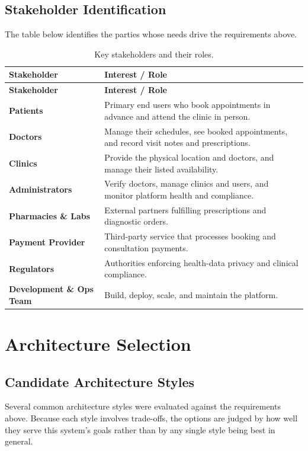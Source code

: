 \documentclass[12pt,a4paper]{article}
\begin{document}
\subsection{Stakeholder Identification}
The table below identifies the parties whose needs drive the requirements above.
\begin{longtable}{>{\bfseries}p{3.2cm} p{10.8cm}}
\caption{Key stakeholders and their roles.}\\
\toprule
\textbf{Stakeholder} & \textbf{Interest / Role}\\
\midrule
\endfirsthead
\toprule
\textbf{Stakeholder} & \textbf{Interest / Role}\\
\midrule
\endhead
Patients & Primary end users who book appointments in advance and attend the clinic in person.\\
Doctors & Manage their schedules, see booked appointments, and record visit notes and
prescriptions.\\
Clinics & Provide the physical location and doctors, and manage their listed availability.\\
Administrators & Verify doctors, manage clinics and users, and monitor platform health and
compliance.\\
Pharmacies \& Labs & External partners fulfilling prescriptions and diagnostic orders.\\
Payment Provider & Third-party service that processes booking and consultation payments.\\
Regulators & Authorities enforcing health-data privacy and clinical compliance.\\
Development \& Ops Team & Build, deploy, scale, and maintain the platform.\\
\bottomrule
\end{longtable}

\section{Architecture Selection}

\subsection{Candidate Architecture Styles}
Several common architecture styles were evaluated against the requirements above. Because each
style involves trade-offs, the options are judged by how well they serve this system's goals
rather than by any single style being best in general.
\end{document}
